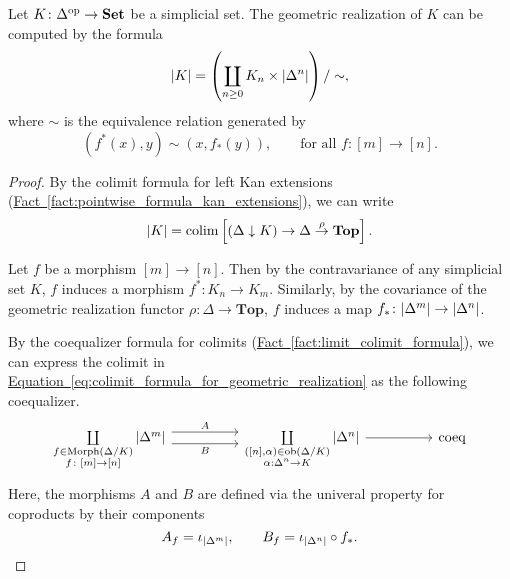 \documentclass[main.tex]{subfiles}
\begin{document}
\begin{theorem}
  \label{thm:formula_for_geometric_realization}
  Let $K\colon \Delta^{\mathrm{op}} \to \mathbf{Set}$ be a simplicial set. The geometric realization of $K$ can be computed by the formula
  \begin{equation*}
    {| K |} = \left( \coprod_{n \geq 0} K_{n} \times {| \Delta^{n} |} \right) /\sim,
  \end{equation*}
  where $\sim$ is the equivalence relation generated by
  \begin{equation*}
    (f^{*}(x), y) \sim (x, f_{*}(y)),\qquad \text{for all } f\colon[m] \to [n].
  \end{equation*}
\end{theorem}
\begin{proof}
  By the colimit formula for left Kan extensions (\hyperref[fact:pointwise_formula_kan_extensions]{Fact~\ref*{fact:pointwise_formula_kan_extensions}}), we can write
  \begin{equation}
    \label{eq:colimit_formula_for_geometric_realization}
    {| K |} = \operatorname*{colim}\left[ (\Delta \downarrow K) \to \Delta \overset{\rho}{\to} \mathbf{Top} \right].
  \end{equation}

  Let $f$ be a morphism $[m] \to [n]$. Then by the contravariance of any simplicial set $K$, $f$ induces a morphism $f^{*}\colon K_{n} \to K_{m}$. Similarly, by the covariance of  the geometric realization functor $\rho\colon \Delta \to \mathbf{Top}$, $f$ induces a map $f_{*}\colon {| \Delta^{m} |} \to {| \Delta^{n} |}$.

  By the coequalizer formula for colimits (\hyperref[fact:limit_colimit_formula]{Fact~\ref*{fact:limit_colimit_formula}}), we can express the colimit in \hyperref[eq:colimit_formula_for_geometric_realization]{Equation~\ref*{eq:colimit_formula_for_geometric_realization}} as the following coequalizer.
  \begin{equation*}
    \begin{tikzcd}[row sep=huge, column sep=huge]
      \coprod\limits_{\substack{f \in \mathrm{Morph}(\Delta/K) \\ f\colon [m] \to [n]}} \abs{\Delta^{m}}
      \arrow[r, shift left=1.75, "A"]
      \arrow[r, swap, shift right=1.75, "B"]
      &
      \coprod\limits_{\substack{([n], \alpha) \in \ob(\Delta/K) \\ \alpha: \Delta^{n} \to K}} \abs{\Delta^{n}}
      \arrow[r]
      & \mathrm{coeq}
    \end{tikzcd}
  \end{equation*}
  Here, the morphisms $A$ and $B$ are defined via the univeral property for coproducts by their components
  \begin{equation*}
    A_{f} = \iota_{{| \Delta^{m} |}},\qquad B_{f} = \iota_{{| \Delta^{n} |}} \circ  f_{*}.
  \end{equation*}


\end{proof}
\end{document}
